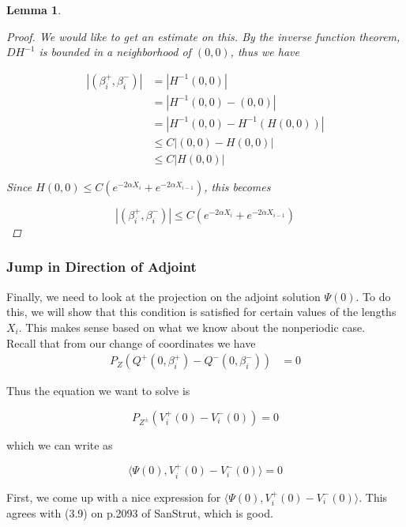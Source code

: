 \documentclass[12pt]{article}
\newtheorem{lemma}{Lemma}
\begin{document}
\begin{lemma}
\begin{proof}
We would like to get an estimate on this. By the inverse function theorem, $D H^{-1}$ is bounded in a neighborhood of $(0, 0)$, thus we have 

\begin{align*}
| (\beta_i^+, \beta_i^-) | &= | H^{-1}(0, 0) | \\
&= | H^{-1}(0, 0) - (0, 0) | \\
&= | H^{-1}(0, 0) - H^{-1}(H(0, 0)) | \\
& \leq C | (0, 0) - H(0, 0) | \\
& \leq C |H(0, 0)|
\end{align*}

Since $H(0, 0) \leq C (e^{-2 \alpha X_i} + e^{-2 \alpha X_{i-1}})$, this becomes

\[
| (\beta_i^+, \beta_i^-) | \leq C (e^{-2 \alpha X_i} + e^{-2 \alpha X_{i-1}})
\]

\end{proof}
\end{lemma}

\subsubsection{Jump in Direction of Adjoint}

Finally, we need to look at the projection on the adjoint solution $\Psi(0)$. To do this, we will show that this condition is satisfied for certain values of the lengths $X_i$. This makes sense based on what we know about the nonperiodic case.\\

Recall that from our change of coordinates we have
\begin{align*}
P_{Z}(Q^+(0, \beta_i^+) - Q^-(0, \beta_i^-)) &= 0
\end{align*}

Thus the equation we want to solve is

\begin{equation}
P_{Z^\pm}(V_i^+(0) - V_i^-(0)) = 0
\end{equation}

which we can write as

\begin{equation}
\langle \Psi(0), V_i^+(0) - V_i^-(0) \rangle = 0
\end{equation}

First, we come up with a nice expression for $\langle \Psi(0), V_i^+(0) - V_i^-(0) \rangle$. This agrees with (3.9) on p.2093 of SanStrut, which is good.
\end{document}
